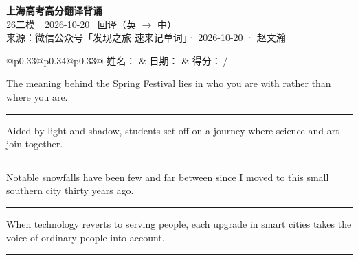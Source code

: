 \documentclass[11pt,a4paper]{article}
\newcommand{\num}[1]{\makebox[1.9em][r]{#1.}\hspace{0.3em}}
\newcommand{\wline}{\noindent\rule{\linewidth}{0.4pt}}
\begin{document}
\pagestyle{plain}
\begin{center}
{\LARGE\bfseries 上海高考高分翻译背诵 }\\[0.25em]
{\large 26二模　2026-10-20 \quad\ 回译（英 $\to$ 中）}\\[0.35em]
{\footnotesize 来源：微信公众号「发现之旅 速来记单词」· 2026-10-20 · 赵文瀚}
\end{center}

\vspace{0.4em}
\noindent\begin{tabular}{@{}p{0.33\textwidth}@{}p{0.34\textwidth}@{}p{0.33\textwidth}@{}}
姓名：\underline{\hspace{2.0cm}} & 日期：\underline{\hspace{2.0cm}} & 得分：\underline{\hspace{1.4cm}}\,/ \\
\end{tabular}

\vspace{0.5em}

\vspace{0.8em}
\num{1}The meaning behind the Spring Festival lies in who you are with rather than where you are.

\vspace{0.25em}

\wline

\num{2}Aided by light and shadow, students set off on a journey where science and art join together.

\vspace{0.25em}

\wline

\num{3}Notable snowfalls have been few and far between since I moved to this small southern city thirty years ago.

\vspace{0.25em}

\wline

\num{4}When technology reverts to serving people, each upgrade in smart cities takes the voice of ordinary people into account.

\vspace{0.25em}

\wline
\end{document}
